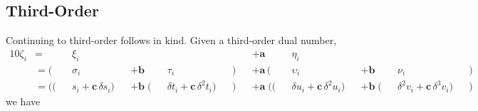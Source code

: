 \subsection*{Third-Order}

Continuing to third-order follows in kind.  Given a third-order dual number,
%
\begin{alignat*}{10}
\zeta_{i} 
&=
&& \xi_{i} && && &&
&&+ \mathbf{a} \, 
&& \eta_{i} && && &&
\\
&=
( && \sigma_{i} && + \mathbf{b} && \tau_{i} &&)
&&+ \mathbf{a} \,
( && \upsilon_{i} && + \mathbf{b} && \nu_{i} && )
\\
&=
(( && s_{i} + \mathbf{c} \, \delta s_{i} )
&& + \mathbf{b} \;
( && \delta t_{i} + \mathbf{c} \, \delta^{2} t_{i}  ) &&)
&&+ \mathbf{a} \;
(( && \delta u_{i} + \mathbf{c} \, \delta^{2} u_{i} )
&& + \mathbf{b} \;
( && \delta^{2} v_{i} + \mathbf{c} \, \delta^{3} v_{i} ) &&)
\end{alignat*}
%
we have
%
